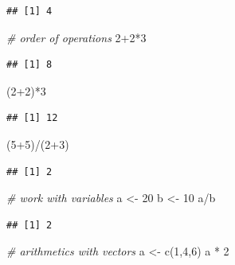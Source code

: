 \documentclass[
  12pt,
]{style/krantz}
\newenvironment{Shaded}{\begin{snugshade}}{\end{snugshade}}
\newcommand{\CommentTok}[1]{\textcolor[rgb]{0.56,0.35,0.01}{\textit{#1}}}
\newcommand{\DecValTok}[1]{\textcolor[rgb]{0.00,0.00,0.81}{#1}}
\newcommand{\FunctionTok}[1]{\textcolor[rgb]{0.00,0.00,0.00}{#1}}
\newcommand{\NormalTok}[1]{#1}
\newcommand{\OtherTok}[1]{\textcolor[rgb]{0.56,0.35,0.01}{#1}}
\newcommand{\SpecialCharTok}[1]{\textcolor[rgb]{0.00,0.00,0.00}{#1}}
\begin{document}
\begin{verbatim}
## [1] 4
\end{verbatim}

\begin{Shaded}
\begin{Highlighting}[]
\CommentTok{\# order of operations}
\DecValTok{2}\SpecialCharTok{+}\DecValTok{2}\SpecialCharTok{*}\DecValTok{3}
\end{Highlighting}
\end{Shaded}

\begin{verbatim}
## [1] 8
\end{verbatim}

\begin{Shaded}
\begin{Highlighting}[]
\NormalTok{(}\DecValTok{2}\SpecialCharTok{+}\DecValTok{2}\NormalTok{)}\SpecialCharTok{*}\DecValTok{3}
\end{Highlighting}
\end{Shaded}

\begin{verbatim}
## [1] 12
\end{verbatim}

\begin{Shaded}
\begin{Highlighting}[]
\NormalTok{(}\DecValTok{5}\SpecialCharTok{+}\DecValTok{5}\NormalTok{)}\SpecialCharTok{/}\NormalTok{(}\DecValTok{2}\SpecialCharTok{+}\DecValTok{3}\NormalTok{)}
\end{Highlighting}
\end{Shaded}

\begin{verbatim}
## [1] 2
\end{verbatim}

\begin{Shaded}
\begin{Highlighting}[]
\CommentTok{\# work with variables}
\NormalTok{a }\OtherTok{\textless{}{-}} \DecValTok{20}
\NormalTok{b }\OtherTok{\textless{}{-}} \DecValTok{10}
\NormalTok{a}\SpecialCharTok{/}\NormalTok{b}
\end{Highlighting}
\end{Shaded}

\begin{verbatim}
## [1] 2
\end{verbatim}

\begin{Shaded}
\begin{Highlighting}[]
\CommentTok{\# arithmetics with vectors}
\NormalTok{a }\OtherTok{\textless{}{-}} \FunctionTok{c}\NormalTok{(}\DecValTok{1}\NormalTok{,}\DecValTok{4}\NormalTok{,}\DecValTok{6}\NormalTok{)}
\NormalTok{a }\SpecialCharTok{*} \DecValTok{2}
\end{Highlighting}
\end{Shaded}
\end{document}
